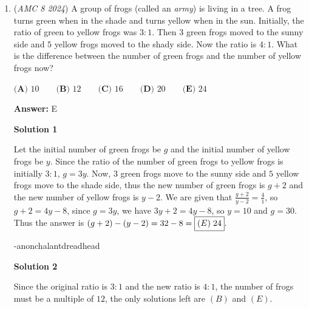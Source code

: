 \begin{enumerate}
After looking at the cube, we realize that an equilateral triangle can only be formed by three lines that form a diagonal along a face of the cube (such as $PV$). Because the problem has a condition that one of the triangle's vertex must be on $P$, the three diagonals that can be formed are $PT, PR$, and $PV$.

 Now, we can choose any of 2 out of the 3 lines we have listed, and connect any of them with another line (for example, if we choose $PT$ and $PR$, the third diagonal is $RT$). Thus, there are 3 ways to choose the 3 diagonals, so the answer is $3$, or $\boxed{\textbf{(D) }3}$

 \textbf{Video Solutions} 


	\item (\textit{AMC 8 2024}) A group of frogs (called an \textit{army}) is living in a tree. A frog turns green when in the shade and turns yellow
when in the sun. Initially, the ratio of green to yellow frogs was $3 : 1$. Then $3$ green frogs moved to the
sunny side and $5$ yellow frogs moved to the shady side. Now the ratio is $4 : 1$. What is the difference
between the number of green frogs and the number of yellow frogs now?


 $\textbf{(A) } 10\qquad\textbf{(B) } 12\qquad\textbf{(C) } 16\qquad\textbf{(D) } 20\qquad\textbf{(E) } 24$

 \textbf{Answer: }E



\textbf{Solution 1}

Let the initial number of green frogs be $g$ and the initial number of yellow frogs be $y$. Since the ratio of the number of green frogs to yellow frogs is initially $3 : 1$, $g = 3y$. Now, $3$ green frogs move to the sunny side and $5$ yellow frogs move to the shade side, thus the new number of green frogs is $g + 2$ and the new number of yellow frogs is $y - 2$. We are given that $\frac{g + 2}{y - 2} = \frac{4}{1}$, so $g + 2 = 4y - 8$, since $g = 3y$, we have $3y + 2 = 4y - 8$, so $y = 10$ and $g = 30$. Thus the answer is $(g + 2) - (y - 2) = 32 - 8 = \boxed{(E) \hspace{1 mm} 24}.$

 -anonchalantdreadhead

 



\textbf{Solution 2}

Since the original ratio is $3:1$ and the new ratio is $4:1$, the number of frogs must be a multiple of $12$, the only solutions left are $(B)$ and $(E)$.  


\end{enumerate}

